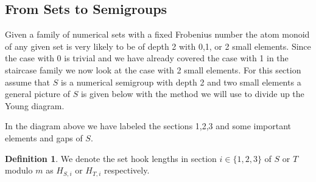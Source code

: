 \documentclass[11pt,letterpaper]{article}
\theoremstyle{definition}
\newtheorem{defn}[thm]{Definition}
\begin{document}
\newpage

\begin{center}
    \section{From Sets to Semigroups}
\end{center}

Given a family of numerical sets with a fixed Frobenius number the atom monoid of any given set is very likely to be of depth 2 with 0,1, or 2 small elements. Since the case with 0 is trivial and we have already covered the case with 1 in the staircase family we now look at the case with 2 small elements. For this section assume that $S$ is a numerical semigroup with depth 2 and two small elements a general picture of $S$ is given below with the method we will use to divide up the Young diagram.

\bigbreak


\begin{center}
\end{center}

In the diagram above we have labeled the sections 1,2,3 and some important elements and gaps of $S$.



\begin{defn}
    We denote the set hook lengths in section $i\in\{1,2,3\}$ of $S$ or $T$ modulo $m$ as $H_{S,i}$ or $H_{T,i}$ respectively.
\end{defn}
\end{document}
